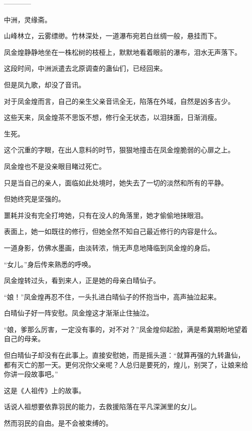 
\begin{this_body}

------------

中洲，灵缘斋。

山峰林立，云雾缥缈。竹林深处，一道瀑布宛若白丝绸一般，悬挂而下。

凤金煌静静地坐在一株松树的枝桠上，默默地看着眼前的瀑布，泪水无声落下。

这段时间，中洲派遣去北原调查的蛊仙们，已经回来。

但是凤九歌，却没了音讯。

对于凤金煌而言，自己的亲生父亲音讯全无，陷落在外域，自然是凶多吉少。

这些天来，凤金煌茶不思饭不想，修行全无状态，以泪抹面，日渐消瘦。

生死。

这个沉重的字眼，在出人意料的时节，狠狠地撞击在凤金煌脆弱的心扉之上。

凤金煌也不是没亲眼目睹过死亡。

只是当自己的亲人，面临如此处境时，她失去了一切的淡然和所有的平静。

但她终究是坚强的。

噩耗并没有完全打垮她，只有在没人的角落里，她才偷偷地抹眼泪。

表面上，她一如既往的修行，但她全然不知自己最近修行的内容是什么。

一道身影，仿佛水墨画，由淡转浓，悄无声息地降临到凤金煌的身后。

“女儿。”身后传来熟悉的呼唤。

凤金煌转过头，看到来人，正是她的母亲白晴仙子。

“娘！”凤金煌再忍不住，一头扎进白晴仙子的怀抱当中，高声抽泣起来。

白晴仙子好一阵安慰。凤金煌这才渐渐止住抽泣。

“娘，爹那么厉害，一定没有事的，对不对？”凤金煌仰起脸，满是希冀期盼地望着自己的母亲。

但白晴仙子却没有在此事上。直接安慰她，而是摇头道：“就算再强的九转蛊仙，都有灭亡的那一天。更何况你父亲呢？人总归是要死的，煌儿，别哭了，让娘来给你讲一段故事吧。”

这是《人祖传》上的故事。

话说人祖想要依靠羽民的能力，去救援陷落在平凡深渊里的女儿。

然而羽民的自由。是不会被束缚的。


\end{this_body}
